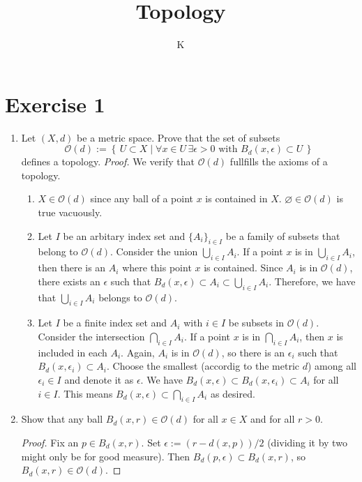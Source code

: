 \documentclass[a4paper]{article}
\title{Topology}
\author{K}
\newcommand{\makeset}[2]{\left\{\, #1 \mid #2 \,\right\}}
\begin{document}
\section*{Exercise 1}
\begin{enumerate}
    \item Let \((X, d)\) be a metric space. Prove that the set of subsets
    \begin{equation}
        \mathcal{O}(d) := \makeset{U \subset X}{\forall x \in U \, \exists \epsilon > 0 \text{ with } B_d(x, \epsilon) \subset U}
    \end{equation}
    defines a topology.
    \newline
    \textit{Proof.} We verify that \(\mathcal{O}(d)\) fullfills the axioms of a topology.
    \begin{enumerate}
        \item \(X \in \mathcal{O}(d)\) since any ball of a point \(x\) is contained in \(X\). \(\varnothing \in \mathcal{O}(d)\) is true vacuously.
        \item Let \(I\) be an arbitary index set and \(\{A_i\}_{i \in I}\) be a family of subsets that belong to \(\mathcal{O}(d)\). Consider the union \(\bigcup_{i \in I}A_i\). If a point \(x\) is in \(\bigcup_{i \in I}A_i\), then there is an \(A_i\) where this point \(x\) is contained. Since \(A_i\) is in \(\mathcal{O}(d)\), there exists an \(\epsilon\) such that \(B_d(x, \epsilon) \subset A_i \subset \bigcup_{i \in I}A_i\). Therefore, we have that \(\bigcup_{i \in I}A_i\) belongs to \(\mathcal{O}(d)\).
        \item Let \(I\) be a finite index set and \(A_i\) with \(i \in I\) be subsets in \(\mathcal{O}(d)\). Consider the intersection \(\bigcap_{i \in I}A_i\). If a point \(x\) is in \(\bigcap_{i \in I}A_i\), then \(x\) is included in each \(A_i\). Again, \(A_i\) is in \(\mathcal{O}(d)\), so there is an \(\epsilon_i\) such that \(B_d(x, \epsilon_i) \subset A_i\). Choose the smallest (accordig to the metric \(d\)) among all \(\epsilon_i \in I\) and denote it as \(\epsilon\). We have \(B_d(x, \epsilon) \subset B_d(x, \epsilon_i) \subset A_i\) for all \(i \in I\). This means \(B_d(x, \epsilon) \subset \bigcap_{i \in I}A_i\) as desired.
    \end{enumerate}

    \item Show that any ball \(B_d(x, r) \in \mathcal{O}(d)\) for all \(x \in X\) and for all \(r > 0\).
    \begin{proof}
        Fix an \(p \in B_d(x, r)\). Set \(\epsilon := (r - d(x, p)) / 2\) (dividing it by two might only be for good measure). Then \(B_d(p, \epsilon) \subset B_d(x, r)\), so \(B_d(x, r) \in \mathcal{O}(d)\).
    \end{proof}


\end{enumerate}
\end{document}
